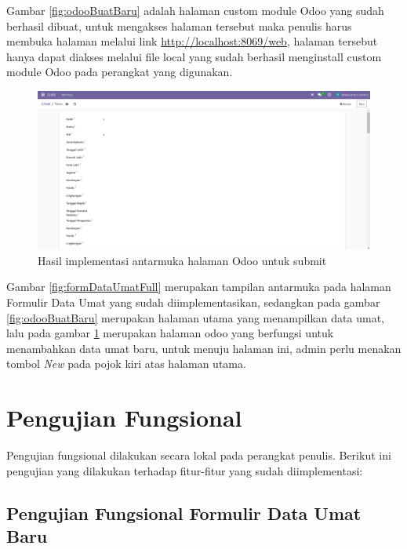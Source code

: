 Gambar \ref{fig:odooBuatBaru} adalah halaman custom module Odoo yang sudah berhasil dibuat, untuk mengakses halaman tersebut maka penulis harus membuka halaman melalui link \url{http://localhost:8069/web}, halaman tersebut hanya dapat diakses melalui file local yang sudah berhasil menginstall custom module Odoo pada perangkat yang digunakan.

\begin{figure}[H]
	\centering
	\includegraphics[scale=0.4]{Gambar/odooBuatBaru2.png}
	\caption{Hasil implementasi antarmuka halaman Odoo untuk submit} 
	\label{fig:odooBuatBaru2}
\end{figure}

Gambar \ref{fig:formDataUmatFull} merupakan tampilan antarmuka pada halaman Formulir Data Umat yang sudah diimplementasikan, sedangkan pada gambar \ref{fig:odooBuatBaru} merupakan halaman utama yang menampilkan data umat, lalu pada gambar \ref{fig:odooBuatBaru2} merupakan halaman odoo yang berfungsi untuk menambahkan data umat baru, untuk menuju halaman ini, admin perlu menakan tombol \textit{New} pada pojok kiri atas halaman utama.

\section{Pengujian Fungsional}
\label{sec:pengujianFungsional}

Pengujian fungsional dilakukan secara lokal pada perangkat penulis. Berikut ini pengujian yang dilakukan terhadap fitur-fitur yang sudah diimplementasi:

\subsection{Pengujian Fungsional Formulir Data Umat Baru}
\label{sec:pengujianFungsionalFormulir}

